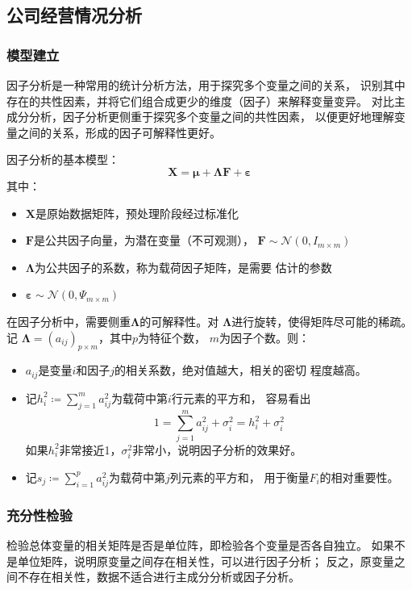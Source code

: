 \subsection{公司经营情况分析}
\subsubsection{模型建立}
因子分析是一种常用的统计分析方法，用于探究多个变量之间的关系，
识别其中存在的共性因素，并将它们组合成更少的维度（因子）来解释变量变异。
对比主成分分析，因子分析更侧重于探究多个变量之间的共性因素，
以便更好地理解变量之间的关系，形成的因子可解释性更好。
\par 因子分析的基本模型：
\begin{equation*}
\bm{X} = \bm{\mu} + \bm{\Lambda F} + \bm{\varepsilon}
\end{equation*}
其中：
\begin{itemize}
    \item $\bm{X}$是原始数据矩阵，预处理阶段经过标准化
    \item $\bm{F}$是公共因子向量，为潜在变量（不可观测），
    $\bm{F}\sim \mathcal{N}(0,I_{m\times m})$
    \item $\bm{\Lambda}$为公共因子的系数，称为载荷因子矩阵，是需要
    估计的参数
    \item $\bm{\varepsilon}\sim\mathcal{N}(0, \Psi_{m\times m})$
\end{itemize}
在因子分析中，需要侧重$\bm{\Lambda}$的可解释性。对
$\bm{\Lambda}$进行旋转，使得矩阵尽可能的稀疏。记
$\bm{\Lambda}=(a_{ij})_{p\times m}$，其中$p$为特征个数，
$m$为因子个数。则：
\begin{itemize}
    \item $a_{ij}$是变量$i$和因子$j$的相关系数，绝对值越大，相关的密切
    程度越高。
    \item 记$h_{i}^2\coloneqq\sum_{j=1}^m a_{ij}^2$为载荷中第$i$行元素的平方和，
    容易看出
    \begin{equation*}
        1=\sum\limits_{j=1}^{m}a_{ij}^2 + \sigma_{i}^2=h_{i}^2+\sigma_{i}^2
    \end{equation*}
    如果$h_{i}^2$非常接近1，$\sigma_i^2$非常小，说明因子分析的效果好。
    \item 记$s_{j}\coloneqq\sum_{i=1}^{p}a_{ij}^2$为载荷中第$j$列元素的平方和，
    用于衡量$F_i$的相对重要性。
\end{itemize}
\subsubsection{充分性检验}
检验总体变量的相关矩阵是否是单位阵，即检验各个变量是否各自独立。
如果不是单位矩阵，说明原变量之间存在相关性，可以进行因子分析；
反之，原变量之间不存在相关性，数据不适合进行主成分分析或因子分析。
